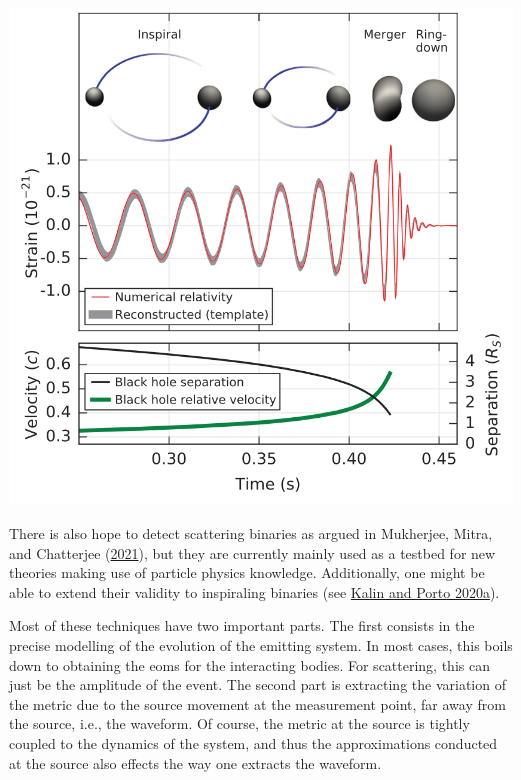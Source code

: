 \documentclass[
  11pt,
  a4paper,
  DIV=11,
  numbers=noendperiod,
  oneside]{scrreprt}
\DeclareRobustCommand{\[}{\begin{equation}}
\DeclareRobustCommand{\]}{\end{equation}}
\begin{document}
\begin{marginfigure}


{\centering \includegraphics{./compactbin.png}

}

\end{marginfigure}

There is also hope to detect scattering binaries as argued in Mukherjee,
Mitra, and Chatterjee (\protect\hyperlink{ref-Mukherjee:2020hnm}{2021}),
but they are currently mainly used as a testbed for new theories making
use of particle physics knowledge. Additionally, one might be able to
extend their validity to inspiraling binaries (see
\protect\hyperlink{ref-Kalin:2019rwq}{Kalin and Porto 2020a}).

Most of these techniques have two important parts. The first consists in
the precise modelling of the evolution of the emitting system. In most
cases, this boils down to obtaining the \glspl{eom} for the interacting
bodies. For scattering, this can just be the amplitude of the event. The
second part is extracting the variation of the metric due to the source
movement at the measurement point, far away from the source, i.e., the
waveform. Of course, the metric at the source is tightly coupled to the
dynamics of the system, and thus the approximations conducted at the
source also effects the way one extracts the waveform.
\end{document}
